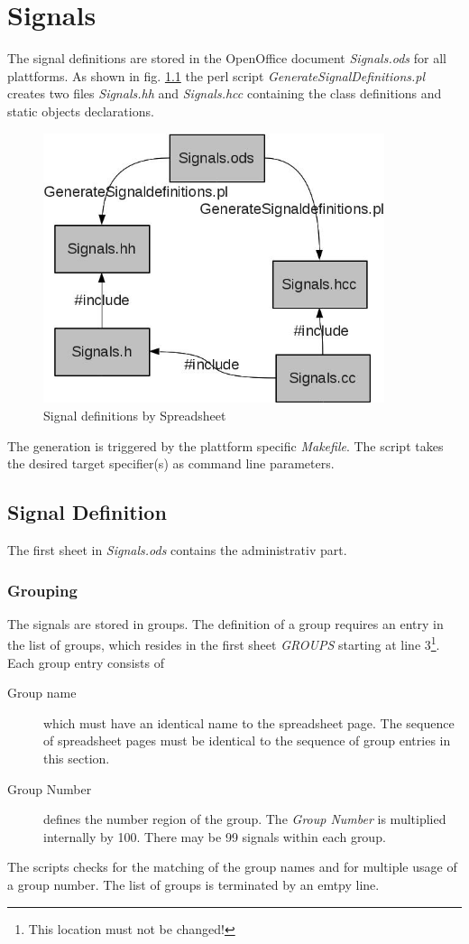 \chapter{Signals}

The signal definitions are stored in the OpenOffice document {\em Signals.ods}
for all plattforms.
As shown in fig. \ref{signals_ods} the perl script
{\em GenerateSignalDefinitions.pl} creates two files
{\em Signals.hh} and {\em Signals.hcc} containing the class definitions 
and static objects declarations. 

\begin{figure}[bpht]
\begin{center}
\includegraphics[width=10cm]{signals_ods.jpg}
\end{center}
\caption{Signal definitions by Spreadsheet}
\label{signals_ods}
\end{figure}

The generation is triggered by the plattform specific {\em Makefile}.
The script takes the desired target specifier(s) as command line
parameters.

\section{Signal Definition}
The first sheet in {\em Signals.ods} contains the administrativ part.

\subsection{Grouping}
The signals are stored in groups. The definition of a group requires
an entry in the list of groups, which resides in the first sheet {\em GROUPS}
starting at line 3\footnote{This location must not be changed!}.
Each group entry consists of
\begin{description}
\item[Group name] which must have an identical name to the spreadsheet page.
   The sequence of spreadsheet pages must be identical to the sequence of
   group entries in this section.
\item[Group Number] defines the number region of the group.
    The {\em Group Number} is multiplied internally by 100.
    There may be 99 signals within each group.
\end{description}
The scripts checks for the matching of the group names and for multiple
usage of a group number.
The list of groups is terminated by an emtpy line.

